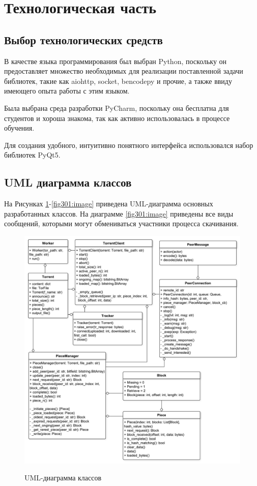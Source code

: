 \section{Технологическая часть}

\subsection{Выбор технологических средств}
В качестве языка программирования был выбран Python, поскольку он предоставляет множество необходимых для реализации поставленной задачи библиотек, такие как aiohttp, socket, bencodepy и прочие, а также ввиду имеющего опыта работы с этим языком. 

Была выбрана среда разработки PyCharm, поскольку она бесплатна для студентов и хороша знакома, так как активно использовалась в процессе обучения.

Для создания удобного, интуитивно понятного интерфейса использовался набор библиотек PyQt5. \newline

\subsection{UML диаграмма классов}
На Рисунках \ref{fig300:image}-\ref{fig301:image} приведена UML-диаграмма основных разработанных классов. На диаграмме \ref{fig301:image} приведены все виды сообщений, которыми могут обмениваться участники процесса скачивания.

\begin{figure}[h]
	\begin{center}
		{\includegraphics[scale = 0.57]{img/uml.pdf}}
		\caption{UML-диаграмма классов}
		\label{fig300:image}
	\end{center}
\end{figure}


